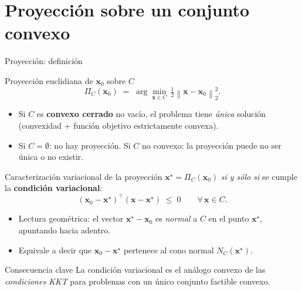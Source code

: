 \documentclass[10pt,aspectratio=169]{beamer}
\newcommand{\x}{\mathbf{x}}
\newcommand{\0}{\mathbf{0}}
\newcommand{\1}{\mathbf{1}}
\newcommand{\norm}[1]{\left\|#1\right\|}
\begin{document}
\section{Proyección sobre un conjunto convexo}
\begin{frame}{Proyección: definición}
  \begin{block}{Proyección euclidiana de $\x_0$ sobre $C$}
    \begin{equation*}
      \Pi_C(\x_0) \;=\; \arg\min_{\x\in C}\, \tfrac{1}{2}\norm{\x - \x_0}_2^2.
    \end{equation*}
  \end{block}
  \begin{itemize}
    \item Si $C$ es \textbf{convexo cerrado} no vacío, el problema tiene
          \emph{única} solución (convexidad + función objetivo estrictamente
          convexa).
    \item Si $C=\emptyset$: no hay proyección. Si $C$ no convexo: la
          proyección puede no ser única o no existir.
  \end{itemize}
\end{frame}

\begin{frame}{Caracterización variacional de la proyección}
  $\x^\star = \Pi_C(\x_0)$ \emph{si y sólo si} se cumple la
  \textbf{condición variacional}:
  \[
    (\x_0 - \x^\star)^\top(\x - \x^\star) \;\le\; 0
    \qquad\forall\,\x\in C.
  \]
  \begin{itemize}
    \item Lectura geométrica: el vector $\x^\star - \x_0$ es \emph{normal}
          a $C$ en el punto $\x^\star$, apuntando hacia adentro.
    \item Equivale a decir que $\x_0 - \x^\star$ pertenece al cono normal
          $N_C(\x^\star)$.
  \end{itemize}
  \begin{alertblock}{Consecuencia clave}
    La condición variacional es el análogo convexo de las
    \emph{condiciones KKT} para problemas con un único conjunto factible
    convexo.
  \end{alertblock}
\end{frame}
\end{document}
